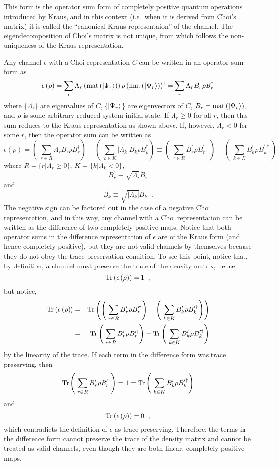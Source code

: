 This form is the operator sum form of completely positive quantum operations introduced by Kraus, and in this context (i.e.\ when it is derived from Choi's matrix) it is called the ``canonical Kraus representaion'' of the channel.  The eigendecomposition of Choi's matrix is not unique, from which follows the non-uniqueness of the Kraus representation.  

Any channel $\epsilon$ with a Choi representation $C$ can be written in an operator sum form as
$$
\epsilon\left(\rho\right) = \sum_r \Lambda_r \left(\operatorname{mat}\left(\left|\Psi_r\right\rangle\right)\right)\rho\left(\operatorname{mat}\left(\left|\Psi_r\right\rangle\right)\right)^\dagger = \sum_r \Lambda_r B_r \rho B_r^\dagger
$$
where \{$\Lambda_r$\} are eigenvalues of $C$, \{$\left|\Psi_r\right\rangle$\} are eigenvectors of $C$, $B_r = \operatorname{mat}\left(\left|\Psi_r\right\rangle\right)$, and $\rho$ is some arbitrary reduced system initial state.  If $\Lambda_r\ge 0$ for all $r$, then this sum reduces to the Kraus representation as shown above.  If, however, $\Lambda_r<0$ for some $r$, then the operator sum can be written as
$$
\epsilon\left(\rho\right) = \left(\;\sum_{r\in R} \Lambda_r B_r \rho B_r^\dagger\right) - \left(\;\sum_{k\in K} |\Lambda_k| B_k \rho B_k^\dagger\right) \equiv \left(\;\sum_{r\in R} B_r^\prime \rho B_r^{\prime\dagger}\right) - \left(\;\sum_{k\in K} B_k^\prime \rho B_k^{\prime\dagger}\right) 
$$
where $R = \{r|\Lambda_r\ge 0\}$, $K = \{k|\Lambda_k < 0\}$,
$$
B_r^\prime \equiv \sqrt{\Lambda_r} B_r
$$
and
$$
B_k^\prime \equiv \sqrt{|\Lambda_k|} B_k\;\;.
$$
The negative sign can be factored out in the case of a negative Choi representation, and in this way, any channel with a Choi representation can be written as the difference of two completely positive maps.  Notice that both operator sums in the difference representation of $\epsilon$ are of the Kraus form (and hence completely positive), but they are not valid channels by themselves because they do not obey the trace preservation condition.  To see this point, notice that, by definition, a channel must preserve the trace of the density matrix; hence
$$
\operatorname{Tr}\left(\epsilon\left(\rho\right)\right) = 1\;\;,
$$
but notice,
\begin{eqnarray*}
\operatorname{Tr}\left(\epsilon\left(\rho\right)\right) &=& \operatorname{Tr}\left(\left(\;\sum_{r\in R} B_r^\prime \rho B_r^{\prime\dagger}\right) - \left(\;\sum_{k\in K} B_k^\prime \rho B_k^{\prime\dagger}\right)\right)\\
&=&\operatorname{Tr}\left(\;\sum_{r\in R} B_r^\prime \rho B_r^{\prime\dagger}\right) - \operatorname{Tr}\left(\;\sum_{k\in K} B_k^\prime \rho B_k^{\prime\dagger}\right)
\end{eqnarray*}
by the linearity of the trace.  If each term in the difference form was trace preserving, then
$$
\operatorname{Tr}\left(\;\sum_{r\in R} B_r^\prime \rho B_r^{\prime\dagger}\right) = 1 = \operatorname{Tr}\left(\;\sum_{k\in K} B_k^\prime \rho B_k^{\prime\dagger}\right)
$$
and
$$
\operatorname{Tr}\left(\epsilon\left(\rho\right)\right) = 0\;\;,
$$
which contradicts the definition of $\epsilon$ as trace preserving.  Therefore, the terms in the difference form cannot preserve the trace of the density matrix and cannot be treated as valid channels, even though they are both linear, completely positive maps.

